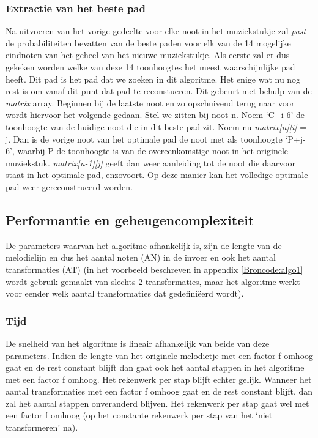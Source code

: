\subsubsection{Extractie van het beste pad}
Na uitvoeren van het vorige gedeelte voor elke noot in het muziekstukje zal \textit{past} de probabiliteiten bevatten van de beste paden voor elk van de 14 mogelijke eindnoten van het geheel van het nieuwe muziekstukje. Als eerste zal er dus gekeken worden welke van deze 14 toonhoogtes het meest waarschijnlijke pad heeft. Dit pad is het pad dat we zoeken in dit algoritme. Het enige wat nu nog rest is om vanaf dit punt dat pad te reconstueren. Dit gebeurt met behulp van de \textit{matrix} array. Beginnen bij de laatste noot en zo opschuivend terug naar voor wordt hiervoor het volgende gedaan. Stel we zitten bij noot n. Noem `C+i-6' de toonhoogte van de huidige noot die in dit beste pad zit. Noem nu \textit{matrix[n][i]} = j. Dan is de vorige noot van het optimale pad de noot met als toonhoogte `P+j-6', waarbij P de toonhoogte is van de overeenkomstige noot in het originele muziekstuk. \textit{matrix[n-1][j]} geeft dan weer aanleiding tot de noot die daarvoor staat in het optimale pad, enzovoort. Op deze manier kan het volledige optimale pad weer gereconstrueerd worden.

\subsection{Performantie en geheugencomplexiteit}
De parameters waarvan het algoritme afhankelijk is, zijn de lengte van de melodielijn en dus het aantal noten (AN) in de invoer en ook het aantal transformaties (AT) (in het voorbeeld beschreven in appendix \ref{Broncode:algo1} wordt gebruik gemaakt van slechts 2 transformaties, maar het algoritme werkt voor eender welk aantal transformaties dat gedefini\"eerd wordt).

\subsubsection{Tijd} 
De snelheid van het algoritme is lineair afhankelijk van beide van deze parameters. Indien de lengte van het originele melodietje met een factor f omhoog gaat en de rest constant blijft dan gaat ook het aantal stappen in het algoritme met een factor f omhoog. Het rekenwerk per stap blijft echter gelijk. Wanneer het aantal transformaties met een factor f omhoog gaat en de rest constant blijft, dan zal het aantal stappen onveranderd blijven. Het rekenwerk per stap gaat wel met een factor f omhoog (op het constante rekenwerk per stap van het `niet transformeren' na).

